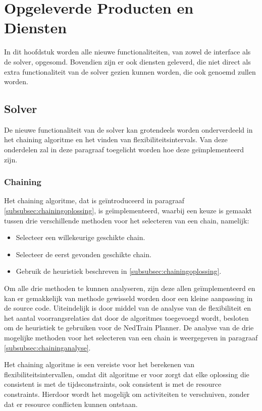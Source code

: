 \section{Opgeleverde Producten en Diensten}

In dit hoofdstuk worden alle nieuwe functionaliteiten, van zowel de interface als de solver, opgesomd. Bovendien zijn er ook diensten geleverd, die niet direct als extra functionaliteit van de solver gezien kunnen worden, die ook genoemd zullen worden.

\subsection{Solver}
De nieuwe functionaliteit van de solver kan grotendeels worden onderverdeeld in het chaining algoritme en het vinden van flexibiliteitsintervals. Van deze onderdelen zal in deze paragraaf toegelicht worden hoe deze ge\"implementeerd zijn.

\subsubsection{Chaining}
Het chaining algoritme, dat is ge\"introduceerd in paragraaf \ref{subsubsec:chainingoplossing}, is ge\"implementeerd, waarbij een keuze is gemaakt tussen drie verschillende methoden voor het selecteren van een chain, namelijk:
\begin{itemize}
\item Selecteer een willekeurige geschikte chain.
\item Selecteer de eerst gevonden geschikte chain.
\item Gebruik de heuristiek beschreven in \ref{subsubsec:chainingoplossing}.
\end{itemize}

Om alle drie methoden te kunnen analyseren, zijn deze allen ge\"implementeerd en kan er gemakkelijk van methode gewisseld worden door een kleine aanpassing in de source code. Uiteindelijk is door middel van de analyse van de flexibiliteit en het aantal voorrangsrelaties dat door de algoritmes toegevoegd wordt, besloten om de heuristiek te gebruiken voor de NedTrain Planner. De analyse van de drie mogelijke methoden voor het selecteren van een chain is weergegeven in paragraaf \ref{subsubsec:chaininganalyse}.

Het chaining algoritme is een vereiste voor het berekenen van flexibiliteitsintervallen, omdat dit algoritme er voor zorgt dat elke oplossing die consistent is met de tijdsconstraints, ook consistent is met de resource constraints. Hierdoor wordt het mogelijk om activiteiten te verschuiven, zonder dat er resource conflicten kunnen ontstaan.

